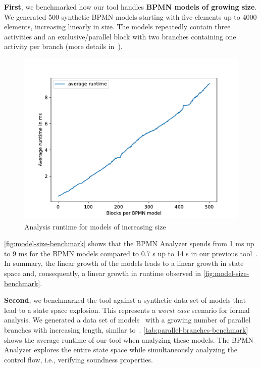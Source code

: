 \documentclass[
twocolumn
]{ceurart}
\begin{document}
\textbf{First}, we benchmarked how our tool handles \textbf{BPMN models of growing size}.
We generated 500 synthetic BPMN models starting with five elements up to 4000 elements, increasing linearly in size.
The models repeatedly contain three activities and an exclusive/parallel block with two branches containing one activity per branch (more details in~\cite{krauterInstantaneousComprehensibleFixable2024}).

\begin{figure}[ht]
	\centering
	\includegraphics[width=1\linewidth]{images/model-size-benchmark}
	\caption{Analysis runtime for models of increasing size}
	\label{fig:model-size-benchmark}
\end{figure}

\autoref{fig:model-size-benchmark} shows that the BPMN Analyzer spends from 1 ms up to 9 ms for the BPMN models compared to 0.7 s up to 14 s in our previous tool~\cite{krauterFormalizationAnalysisBPMN2023}.
In summary, the linear growth of the models leads to a linear growth in state space and, consequently, a linear growth in runtime observed in \autoref{fig:model-size-benchmark}.

\textbf{Second}, we benchmarked the tool against a synthetic data set of models that lead to a state space explosion.
This represents a \textit{worst case} scenario for formal analysis.
We generated a data set of models~\cite{krauterInstantaneousComprehensibleFixable2024} with a growing number of parallel branches with increasing length, similar to~\cite{corradiniFormalApproachAnalysis2021}.
\autoref{tab:parallel-branches-benchmark} shows the average runtime of our tool when analyzing these models.
The BPMN Analyzer explores the entire state space while simultaneously analyzing the control flow, i.e., verifying soundness properties.
\end{document}
